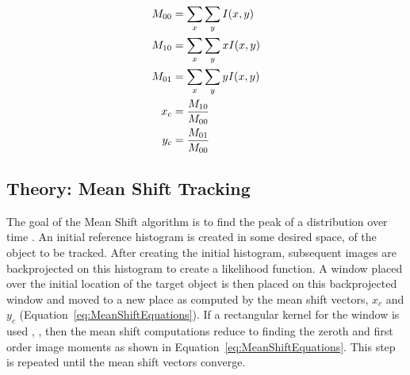 \documentclass{article}
\begin{document}
\begin{itemize}
\begin{align}
	\label{eq:MeanShiftEquations}
	M_{00}&=\sum_x\sum_yI(x,y)\notag\\
	M_{10}&=\sum_x\sum_yxI(x,y)\notag\\
	M_{01}&=\sum_x\sum_yyI(x,y)\\
	x_c&=\frac{M_{10}}{M_{00}}\notag \\
	y_c&=\frac{M_{01}}{M_{00}} \notag
\end{align}

\subsection{Theory: Mean Shift Tracking}
The goal of the Mean Shift algorithm is to find the peak of a distribution over time  \cite{2003_JNL_TRKkernel_Comaniciu}.  An initial reference histogram is created in some desired space, of the object to be tracked.   After creating the initial histogram, subsequent images are backprojected on this histogram to create a likelihood function.  A window placed over the initial location of the target object is then placed on this backprojected window and moved to a new place as computed by the mean shift vectors, $x_c$ and $y_c$ (Equation~\ref{eq:MeanShiftEquations}).  If a rectangular kernel for the window is used \cite{1998_JNL_FaceObjectTracking_Bradski}, \cite{2008_BOOK_OpenCV_Bradski}, then the mean shift computations reduce to finding the zeroth and first order image moments as shown in Equation~\ref{eq:MeanShiftEquations}.  This step is repeated until the mean shift vectors converge.  

			\begin{figure}%
				\centering
				
					

\end{figure}
\end{itemize}
\end{document}

